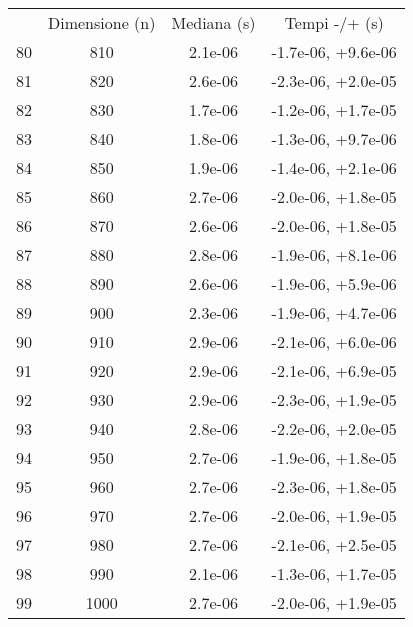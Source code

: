 \begin{table}
\centering
\begin{adjustbox}{width=1\textwidth/2}
\begin{tabular}{|c|c|c|c|}
\hline
 & Dimensione (n) & Mediana (s) & Tempi -/+ (s) \\
80 & 810 & 2.1e-06 & -1.7e-06, +9.6e-06 \\
\cline{1-4}
81 & 820 & 2.6e-06 & -2.3e-06, +2.0e-05 \\
\cline{1-4}
82 & 830 & 1.7e-06 & -1.2e-06, +1.7e-05 \\
\cline{1-4}
83 & 840 & 1.8e-06 & -1.3e-06, +9.7e-06 \\
\cline{1-4}
84 & 850 & 1.9e-06 & -1.4e-06, +2.1e-06 \\
\cline{1-4}
85 & 860 & 2.7e-06 & -2.0e-06, +1.8e-05 \\
\cline{1-4}
86 & 870 & 2.6e-06 & -2.0e-06, +1.8e-05 \\
\cline{1-4}
87 & 880 & 2.8e-06 & -1.9e-06, +8.1e-06 \\
\cline{1-4}
88 & 890 & 2.6e-06 & -1.9e-06, +5.9e-06 \\
\cline{1-4}
89 & 900 & 2.3e-06 & -1.9e-06, +4.7e-06 \\
\cline{1-4}
90 & 910 & 2.9e-06 & -2.1e-06, +6.0e-06 \\
\cline{1-4}
91 & 920 & 2.9e-06 & -2.1e-06, +6.9e-05 \\
\cline{1-4}
92 & 930 & 2.9e-06 & -2.3e-06, +1.9e-05 \\
\cline{1-4}
93 & 940 & 2.8e-06 & -2.2e-06, +2.0e-05 \\
\cline{1-4}
94 & 950 & 2.7e-06 & -1.9e-06, +1.8e-05 \\
\cline{1-4}
95 & 960 & 2.7e-06 & -2.3e-06, +1.8e-05 \\
\cline{1-4}
96 & 970 & 2.7e-06 & -2.0e-06, +1.9e-05 \\
\cline{1-4}
97 & 980 & 2.7e-06 & -2.1e-06, +2.5e-05 \\
\cline{1-4}
98 & 990 & 2.1e-06 & -1.3e-06, +1.7e-05 \\
\cline{1-4}
99 & 1000 & 2.7e-06 & -2.0e-06, +1.9e-05 \\
\cline{1-4}
\end{tabular}
\end{adjustbox}
\end{table}

